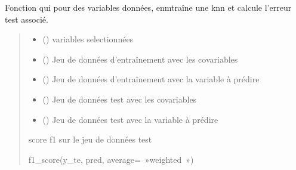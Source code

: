 \documentclass[letterpaper,10pt,french]{sphinxmanual}
\begin{document}
\begin{fulllineitems}
\label{\detokenize{KNN_sel_var:KNN_sel_var.pred_acc_var}}
\pysigstartsignatures
{}
\pysigstopsignatures
\sphinxAtStartPar
Fonction qui pour des variables données, enmtraîne une knn et calcule l’erreur test associé.
\begin{quote}\begin{description}
\begin{itemize}
\item {} 
\sphinxAtStartPar
{} () \textendash{} variables selectionnées

\item {} 
\sphinxAtStartPar
{} () \textendash{} Jeu de données d’entraînement avec les co\sphinxhyphen{}variables

\item {} 
\sphinxAtStartPar
{} () \textendash{} Jeu de données d’entraînement avec la variable à prédire

\item {} 
\sphinxAtStartPar
{} () \textendash{} Jeu de données test avec les co\sphinxhyphen{}variables

\item {} 
\sphinxAtStartPar
{} () \textendash{} Jeu de données test avec la variable à prédire

\end{itemize}

\sphinxAtStartPar
score f1 sur le jeu de données test

\sphinxAtStartPar
f1\_score(y\_te, pred, average= »weighted »)

\end{description}\end{quote}

\end{fulllineitems}
\end{document}

